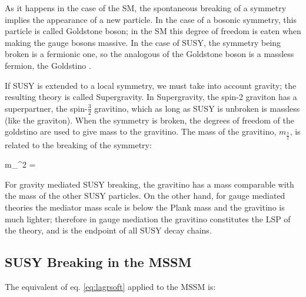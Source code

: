 As it happens in the case of the SM, the spontaneous breaking of a symmetry implies the appearance of a new particle. In the case of a bosonic symmetry, this particle is called Goldstone boson; in the SM this degree of freedom is eaten when making the gauge bosons massive. In the case of SUSY, the symmetry being broken is a fermionic one, so the analogous of the Goldstone boson is a massless fermion, the Goldstino \cite{tasi:largeandsmall}. 

If SUSY is extended to a local symmetry, we must take into account gravity; the resulting theory is called Supergravity. In Supergravity, the spin-2 graviton has a superpartner, the spin-$\frac{3}{2}$ gravitino, which as long as SUSY is unbroken is massless (like the graviton). When the symmetry is broken, the degrees of freedom of the goldstino are used to give mass to the gravitino. The mass of the gravitino, $m_\frac{3}{2}$, is related to the breaking of the symmetry:

\beq
m_^2 = 
\eeq

For gravity mediated SUSY breaking, the gravitino has a mass comparable with the mass of the other SUSY particles. On the other hand, for gauge mediated theories the mediator mass scale is below the Plank mass and the gravitino is much lighter; therefore in gauge mediation the gravitino constitutes the LSP of the theory, and is the endpoint of all SUSY decay chains.

\subsection{SUSY Breaking in the MSSM}

The equivalent of eq. \ref{eq:lagrsoft} applied to the MSSM is:



